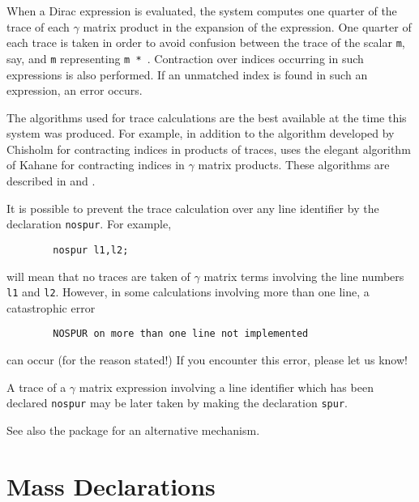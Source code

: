 When a Dirac expression is evaluated, the system computes one quarter of
the trace of each $\gamma$ matrix product in the expansion of the expression.
One quarter of each trace is taken in order to avoid confusion between the
trace of the scalar \texttt{m}, say, and \texttt{m} representing
\texttt{m * }.
Contraction over indices occurring in such expressions is
also performed.  If an unmatched index is found in such an expression, an
error occurs.

The algorithms used for trace calculations are the best available at the
time this system was produced. For example, in addition to the algorithm
developed by Chisholm for contracting indices in products of traces,
{\REDUCE} uses the elegant algorithm of Kahane for contracting indices in
$\gamma$ matrix products.  These algorithms are described in \cite{Chisholm1963}
and \cite{Kahane:1968}.

It is possible to prevent the trace calculation over any line identifier
by the declaration \texttt{nospur}.  For example,
\begin{verbatim}
        nospur l1,l2;
\end{verbatim}
will mean that no traces are taken of $\gamma$ matrix terms involving the line
numbers \texttt{l1} and \texttt{l2}.  However, in some calculations involving
more than one line, a catastrophic error
\begin{verbatim}
        NOSPUR on more than one line not implemented
\end{verbatim}
can occur (for the reason stated!) If you encounter this error, please let
us know!

A trace of a $\gamma$ matrix expression involving a line identifier which has
been declared \texttt{nospur} may be later taken by making the declaration
\texttt{spur}.

See also the  package for an alternative
mechanism.

\section{Mass Declarations}
\hypertarget{command:MASS}{}
\hypertarget{command:MSHELL}{}

